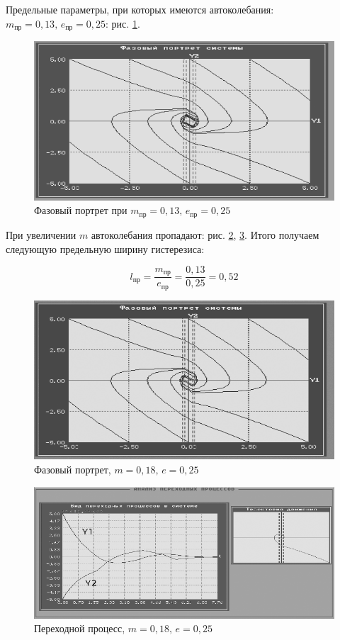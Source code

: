 	Предельные параметры, при которых имеются автоколебания: $m_\text{пр} = 0,13,\,e_\text{пр}=0,25$: рис. \ref{issl3}.
	
	\begin{figure}[h]
		\centering\includegraphics[width=.6\textwidth]{png/16.png}
		\caption{Фазовый портрет при $m_\text{пр} = 0,13,\,e_\text{пр}=0,25$}
		\label{issl3}
	\end{figure}
	
	При увеличении $m$ автоколебания пропадают: рис. \ref{issl4}, \ref{issl4_p}. Итого получаем следующую предельную ширину гистерезиса: 
	
	\begin{equation*}
		l_\text{пр} = \dfrac{m_\text{пр}}{e_\text{пр}} = \dfrac{0,13}{0,25} = 0,52
	\end{equation*}

	\begin{figure}[h]
		\centering\includegraphics[width=.6\textwidth]{png/17.png}
		\caption{Фазовый портрет, $m=0,18,\,e=0,25$}
		\label{issl4}
	\end{figure}
	
	\begin{figure}[h]
		\centering\includegraphics[width=.6\textwidth]{png/18.png}
		\caption{Переходной процесс, $m=0,18,\,e=0,25$}
		\label{issl4_p}
	\end{figure}
	

